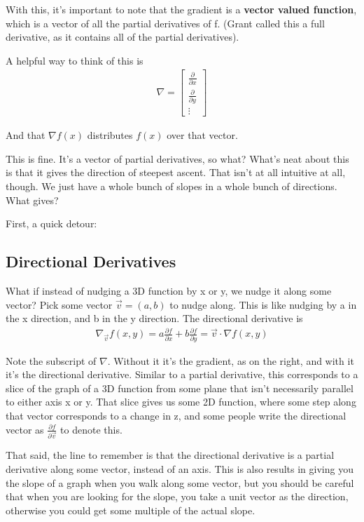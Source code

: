 \documentclass[12pt, letterpaper]{article}
\begin{document}
With this, it's important to note that the gradient is a \textbf{vector valued function}, which is a vector of all the partial derivatives of f. (Grant called this a full derivative, as it contains all of the partial derivatives).

A helpful way to think of this is
\begin{gather*}
    \nabla = \begin{bmatrix}
        \frac{\partial}{\partial x}\\
        \frac{\partial}{\partial y}\\
        \vdots
    \end{bmatrix}
\end{gather*}

And that $\nabla f(x)$ distributes $f(x)$ over that vector.

This is fine. It's a vector of partial derivatives, so what? What's neat about this is that it gives the direction of steepest ascent. That isn't at all intuitive at all, though. We just have a whole bunch of slopes in a whole bunch of directions. What gives?

First, a quick detour:

\subsection{Directional Derivatives}
What if instead of nudging a 3D function by x or y, we nudge it along some vector?
Pick some vector $\vec{v} = (a, b)$ to nudge along. This is like nudging by a in the x direction, and b in the y direction.
The directional derivative is
\begin{gather*}
    {\nabla}_{\vec{v}} f(x, y) 
    = a\frac{\partial f}{\partial x} + b\frac{\partial f}{\partial y} 
    = \vec{v} \cdot \nabla f(x, y)
\end{gather*}

Note the subscript of $\nabla$. Without it it's the gradient, as on the right, and with it it's the directional derivative.
Similar to a partial derivative, this corresponds to a slice of the graph of a 3D function from some plane that isn't necessarily parallel to either axis x or y.
That slice gives us some 2D function, where some step along that vector corresponds to a change in z, and some people write the directional vector as \Large $\frac{\partial f}{\partial \vec{v}}$ \normalsize to denote this.

That said, the line to remember is that the directional derivative is a partial derivative along some vector, instead of an axis. This is also results in giving you the slope of a graph when you walk along some vector, but you should be careful that when you are looking for the slope, you take a unit vector as the direction, otherwise you could get some multiple of the actual slope. 
\end{document}
